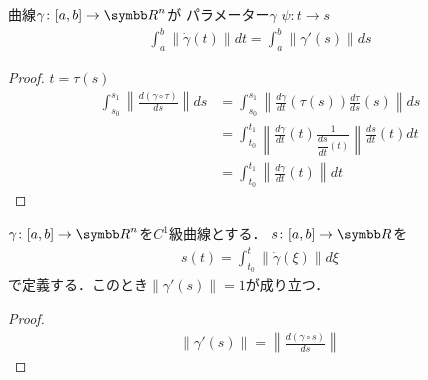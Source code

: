 \documentclass{ltjsbook}
\begin{document}
\begin{thmbox}
\begin{proposition}
曲線\(\gamma\colon [a, b] \to {\Real}^n\)が
パラメーター\(\gamma\)
\(\psi\colon t \to s\)
\begin{align*}
    \int_a^b \lVert \dot{\gamma}(t) \rVert dt
    = \int_a^b \lVert \gamma'(s) \rVert ds
\end{align*}
\end{proposition}
\end{thmbox}

\begin{proof}
\(t = \tau(s)\)
\begin{align*}
    \int_{s_0}^{s_1} \left\lVert \frac{d(\gamma \circ \tau)}{ds}\right\rVert ds
    &= \int_{s_0}^{s_1} \left\lVert \frac{d\gamma}{dt}(\tau(s)) \frac{d\tau}{ds}(s) \right\rVert ds \\
    &= \int_{t_0}^{t_1} \left\lVert \frac{d\gamma}{dt}(t) \frac{1}{\dfrac{ds}{dt}(t)} \right\rVert \frac{ds}{dt}(t) dt \\
    &= \int_{t_0}^{t_1} \left\lVert \frac{d\gamma}{dt}(t) \right\rVert dt
\end{align*}
\end{proof}

\begin{thmbox}
\begin{proposition}
\(\gamma \colon [a, b] \to {\Real}^n\)を\(C^1\)級曲線とする．
\(s\colon [a, b] \to {\Real}\)を
\begin{align*}
    s(t) = \int_{t_0}^t \left\lVert \dot{\gamma}(\xi) \right\rVert d\xi
\end{align*}
で定義する．このとき\(\lVert \gamma' (s) \rVert = 1\)が成り立つ．
\end{proposition}
\end{thmbox}

\begin{proof}
\begin{align*}
    \lVert \gamma'(s) \rVert = \left\lVert \frac{d(\gamma \circ s)}{ds} \right\rVert
\end{align*}
\end{proof}
\end{document}
